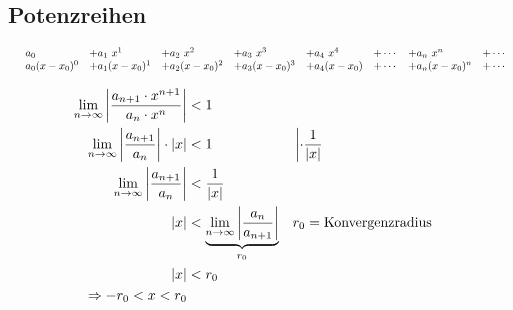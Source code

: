 \subsection{Potenzreihen}


\[
    \begin{array}{lll lll lll}
    &a_0 & + a_1\ x^1 & + a_2\ x^2 & + a_3\ x^3 & + a_4\ x^4 & + \cdots & + a_n\ x^n & + \cdots \\
    &a_0 (x-x_0)^0 & + a_1 (x-x_0)^1 & + a_2 (x-x_0)^2 & + a_3 (x-x_0)^3 & + a_4 (x-x_0) & + \cdots & + a_n (x-x_0)^n & + \cdots
    \end{array}    
\]

\begin{align*}
    \lim_{n \rightarrow \infty} \left| \frac{a_{n+1} \cdot x^{n+1}}{a_n \cdot x^n} \right| &< 1 \\
    \lim_{n \rightarrow \infty} \left| \frac{a_{n+1}}{a_n} \right| \cdot | x | &< 1 &&\left| \cdot \frac{1}{| x |} \right. \\
    \lim_{n \rightarrow \infty} \left| \frac{a_{n+1}}{a_n} \right| &< \frac{1}{| x |} \\
    | x | &< \underbrace{\lim_{n \rightarrow \infty} \left| \frac{a_n}{a_{n+1}} \right|}_{r_0} && r_0 = \text{Konvergenzradius} \\
    | x | &< r_0 \\
    \Rightarrow -r_0 < x < r_0
\end{align*}

\begin{figure}[H]
    \centering
\end{figure}


